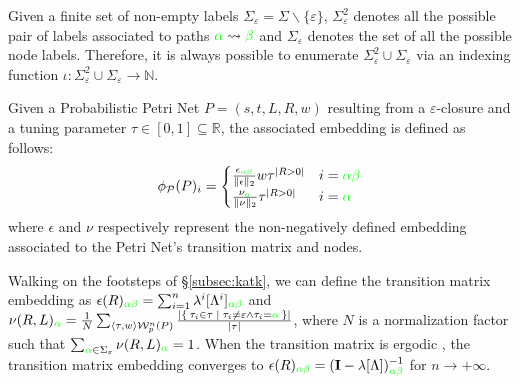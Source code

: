 \begin{definition}\label{def:ppne}
Given a finite set of non-empty labels $\Sigma_\varepsilon =\Sigma\backslash\{\varepsilon\}$, $\Sigma_\varepsilon^2$ denotes all the possible pair of labels associated to paths ${\color{green}\alpha}\rightsquigarrow{\color{green}\beta}$ and $\Sigma_\varepsilon$ denotes the set of all the possible node labels. Therefore, it is always possible to enumerate $\Sigma_\varepsilon^2\cup\Sigma_\varepsilon$ via an indexing function $\iota\colon \Sigma_\varepsilon^2\cup\Sigma_\varepsilon\to  \mathbb{N}$.
	
Given a Probabilistic Petri Net $P=(s,t,L,R,w)$ resulting from a $\varepsilon$-closure and a tuning parameter $\tau\in[0,1]\subseteq\mathbb{R}$, the associated embedding is defined as follows:
$$\phi_{\mathcal{P}}(P)_i=\begin{cases}
	\frac{\epsilon_{\color{green}\alpha\beta}}{\|\epsilon\|_2}w\tau^{|R>0|} & i={\color{green}\alpha\beta}\\
	\frac{\nu_{\color{green}\alpha}}{\|\nu\|_2}\tau^{|R>0|} & i={\color{green}\alpha}\\
\end{cases}$$
where $\epsilon$ and $\nu$ respectively represent the non-negatively defined embedding associated to the Petri Net's transition matrix and nodes. 
\end{definition}

Walking on the footsteps of \S\ref{subsec:katk}, we can define the transition matrix embedding as  $\epsilon(R)_{\color{green}\alpha\beta}=\sum_{i=1}^n\lambda^i[\Lambda^i]_{\color{green}\alpha\beta}$ and $\nu(R,L)_{\color{green}\alpha}=\frac{1}{N}\sum_{\braket{\tau,w}\mathcal{W}_p^n(P)}\frac{|\Set{\tau_i\in\tau|\tau_i\neq\varepsilon\wedge \tau_i={\color{green}\alpha}}|}{|\tau|}$, where $N$ is a normalization factor such that $\sum_{{\color{green}\alpha}\in\Sigma_\varepsilon}\nu(R,L)_{\color{green}\alpha}=1$. When the transition matrix is ergodic \cite{StocasticCC},  the transition matrix embedding converges to $\epsilon(R)_{\color{green}\alpha\beta}=(\mathbf{I}-\lambda[\Lambda])^{-1}_{\color{green}\alpha\beta}$ \cite{GartnerFW03} for $n\to+\infty$.

